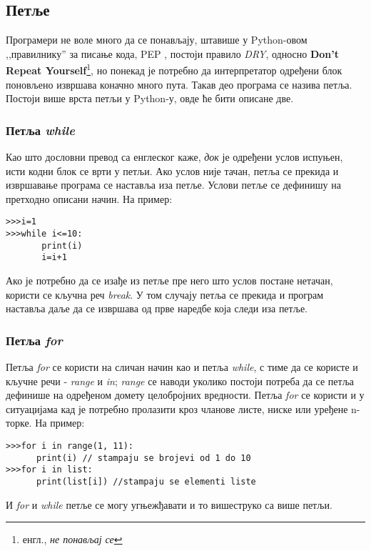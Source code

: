 \subsection{Петље}

Програмери не воле много да се понављају, штавише у Python-овом ,,правилнику'' за писање кода, PEP \cite{PEP}, постоји правило \emph{DRY}, односно \textbf{Don't Repeat Yourself}\footnote{енгл., \emph{не понављај се}}, но понекад је потребно да интерпретатор одређени блок поновљено извршава коначно много пута. Такав део програма се назива петља. Постоји више врста петљи у Python-у, овде ће бити описане две.

\subsubsection{Петља \emph{while}}

Као што дословни превод са енглеског каже, \emph{док} је одређени услов испуњен, исти кодни блок се врти у петљи. Ако услов није тачан, петља се прекида и извршавање програма се наставља иза петље. Услови петље се дефинишу на претходно описани начин. На пример:

\begin{lstlisting}[caption = Пример while петље, label = while]
>>>i=1
>>>while i<=10:
       print(i)
       i=i+1
\end{lstlisting}

Ако је потребно да се изађе из петље пре него што услов постане нетачан, користи се кључна реч \emph{break}. У том случају петља се прекида и програм наставља даље да се извршава од прве наредбе која следи иза петље.

\subsubsection{Петља \emph{for}}

Петља \emph{for} се користи на сличан начин као и петља \emph{while}, с тиме да се користе и кључне речи - \emph{range} и \emph{in}; \emph{range} се наводи уколико постоји потреба да се петља дефинише на одређеном домету целобројних вредности. Петља \emph{for} се користи и у ситуацијама кад је потребно пролазити кроз чланове листе, ниске или уређене n-торке. На пример:

\begin{lstlisting}[caption = Примери \emph{for} петље, label = for]
>>>for i in range(1, 11):
      print(i) // stampaju se brojevi od 1 do 10
>>>for i in list:
      print(list[i]) //stampaju se elementi liste
\end{lstlisting}

И \emph{for} и \emph{while} петље се могу угњежђавати и то вишеструко са више петљи.
